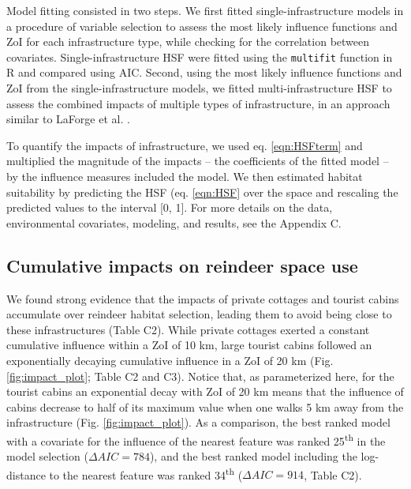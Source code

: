 \documentclass[titlepage]{article}
\begin{document}
Model fitting consisted in two steps. We first fitted single-infrastructure models in a procedure of variable selection \citep{burnham_model_2002} to assess the most likely influence functions and ZoI for each infrastructure type, while checking for the correlation between covariates. Single-infrastructure HSF were fitted using the \verb|multifit| function in R \citep{huais_multifit_2018} and compared using AIC. Second, using the most likely influence functions and ZoI from the single-infrastructure models, we fitted multi-infrastructure HSF to assess the combined impacts of multiple types of infrastructure, in an approach similar to LaForge et al. \citealt{laforge_process-focussed_2015}. 

To quantify the impacts of infrastructure, we used eq. \ref{eqn:HSFterm} and multiplied the magnitude of the impacts -- the coefficients of the fitted model -- by the influence measures included the model. We then estimated habitat suitability by predicting the HSF (eq. \ref{eqn:HSF} over the space and rescaling the predicted values to the interval [0, 1]. For more details on the data, environmental covariates, modeling, and results, see the Appendix C.

\subsection{Cumulative impacts on reindeer space use}

We found strong evidence that the impacts of private cottages and tourist cabins accumulate over reindeer habitat selection, leading them to avoid being close to these infrastructures (Table C2). While private cottages exerted a constant cumulative influence within a ZoI of 10 km, large tourist cabins followed an exponentially decaying cumulative influence in a ZoI of 20 km (Fig. \ref{fig:impact_plot}; Table C2 and C3). Notice that, as parameterized here, for the tourist cabins an exponential decay with ZoI of 20 km means
that the influence of cabins decrease to half of its maximum value
when one walks 5 km away from the infrastructure (Fig. \ref{fig:impact_plot}). As a comparison, the best ranked model with a covariate for the influence of the nearest feature was ranked 25\textsuperscript{th} in the model selection ($\Delta AIC = 784$), and the best ranked model including the log-distance to the nearest feature was ranked 34\textsuperscript{th} ($\Delta AIC = 914$, Table C2).
\end{document}
